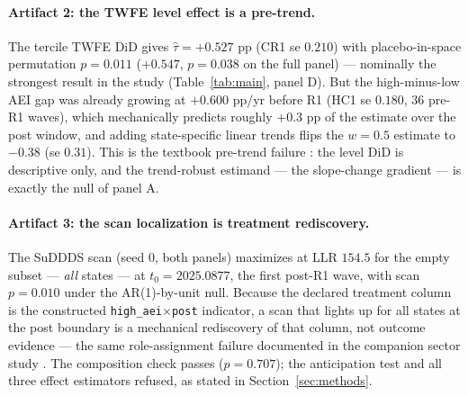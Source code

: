\documentclass[11pt]{article}
\begin{document}
\paragraph{Artifact 2: the TWFE level effect is a pre-trend.} The tercile
TWFE DiD gives $\hat\tau=+0.527$ pp (CR1 se $0.210$) with placebo-in-space
permutation $p=0.011$ ($+0.547$, $p=0.038$ on the full panel) --- nominally
the strongest result in the study (Table~\ref{tab:main}, panel D). But the
high-minus-low AEI gap was already growing at $+0.600$ pp/yr before R1 (HC1
se $0.180$, 36 pre-R1 waves), which mechanically predicts roughly $+0.3$ pp
of the estimate over the post window, and adding state-specific linear
trends flips the $w=0.5$ estimate to $-0.38$ (se $0.31$). This is the
textbook pre-trend failure \cite{roth2022}: the level DiD is descriptive
only, and the trend-robust estimand --- the slope-change gradient --- is
exactly the null of panel A.

\paragraph{Artifact 3: the scan localization is treatment rediscovery.} The
SuDDDS scan (seed 0, both panels) maximizes at LLR $154.5$ for the empty
subset --- \emph{all} states --- at $t_0=2025.0877$, the first post-R1 wave,
with scan $p=0.010$ under the AR(1)-by-unit null. Because the declared
treatment column is the constructed \texttt{high\_aei}$\times$\texttt{post}
indicator, a scan that lights up for all states at the post boundary is a
mechanical rediscovery of that column, not outcome evidence --- the same
role-assignment failure documented in the companion sector study
\cite{hillebrandt2026r1}. The composition check passes ($p=0.707$); the
anticipation test and all three effect estimators refused, as stated in
Section~\ref{sec:methods}.
\end{document}
